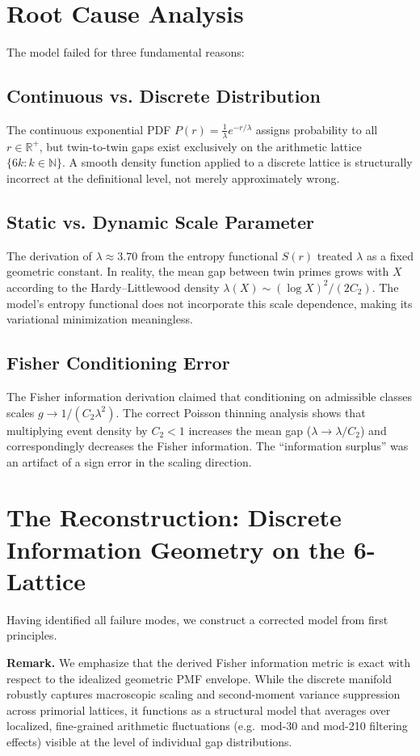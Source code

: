 \documentclass[11pt]{article}
\begin{document}
\section{Root Cause Analysis}
The model failed for three fundamental reasons:

\subsection{Continuous vs. Discrete Distribution}
The continuous exponential PDF $P(r) = \frac{1}{\lambda}e^{-r/\lambda}$ assigns probability to all $r \in \mathbb{R}^+$, but twin-to-twin gaps exist exclusively on the arithmetic lattice $\{6k : k \in \mathbb{N}\}$. A smooth density function applied to a discrete lattice is structurally incorrect at the definitional level, not merely approximately wrong.

\subsection{Static vs. Dynamic Scale Parameter}
The derivation of $\lambda \approx 3.70$ from the entropy functional $S(r)$ treated $\lambda$ as a fixed geometric constant. In reality, the mean gap between twin primes grows with $X$ according to the Hardy--Littlewood density $\lambda(X) \sim (\log X)^2/(2C_2)$. The model's entropy functional does not incorporate this scale dependence, making its variational minimization meaningless.

\subsection{Fisher Conditioning Error}
The Fisher information derivation claimed that conditioning on admissible classes scales $g \to 1/(C_2\lambda^2)$. The correct Poisson thinning analysis shows that multiplying event density by $C_2 < 1$ increases the mean gap ($\lambda \to \lambda/C_2$) and correspondingly decreases the Fisher information. The ``information surplus'' was an artifact of a sign error in the scaling direction.
\section{The Reconstruction: Discrete Information Geometry on the 6-Lattice}
Having identified all failure modes, we construct a corrected model from first principles.

\noindent\textbf{Remark.} We emphasize that the derived Fisher information metric is exact with respect to the idealized geometric PMF envelope. While the discrete manifold robustly captures macroscopic scaling and second-moment variance suppression across primorial lattices, it functions as a structural model that averages over localized, fine-grained arithmetic fluctuations (e.g.\ mod-30 and mod-210 filtering effects) visible at the level of individual gap distributions.
\end{document}
